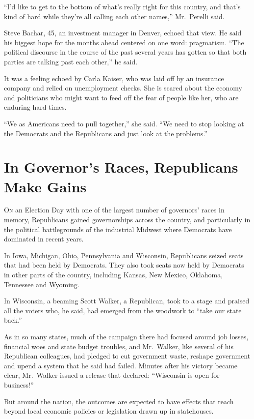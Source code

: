 ﻿\documentclass[12pt]{article}
\begin{document}
``I'd like to get to the bottom of what's really right for this country, and that's kind of hard
while they're all calling each other names,'' Mr.~Perelli said.

Steve Bachar, 45, an investment manager in Denver, echoed that view. He said his biggest hope for
the months ahead centered on one word: pragmatism. ``The political discourse in the course of the
past several years has gotten so that both parties are talking past each other,'' he said.

It was a feeling echoed by Carla Kaiser, who was laid off by an insurance company and relied on
unemployment checks. She is scared about the economy and politicians who might want to feed off the
fear of people like her, who are enduring hard times.

``We as Americans need to pull together,'' she said. ``We need to stop looking at the Democrats and
the Republicans and just look at the problems.''

\section{In Governor's Races, Republicans Make Gains}

\lettrine{O}{n} an Election Day with one of the largest number of governors'
races in memory, Republicans gained governorships across the country, and particularly in the
political battlegrounds of the industrial Midwest where Democrats have dominated in recent years.

In Iowa, Michigan, Ohio, Pennsylvania and Wisconsin, Republicans seized seats that had been held by
Democrats. They also took seats now held by Democrats in other parts of the country, including
Kansas, New Mexico, Oklahoma, Tennessee and Wyoming.

In Wisconsin, a beaming Scott Walker, a Republican, took to a stage and praised all the voters who,
he said, had emerged from the woodwork to ``take our state back.''

As in so many states, much of the campaign there had focused around job losses, financial woes and
state budget troubles, and Mr.~Walker, like several of his Republican colleagues, had pledged to cut
government waste, reshape government and upend a system that he said had failed. Minutes after his
victory became clear, Mr.~Walker issued a release that declared: ``Wisconsin is open for business!''

But around the nation, the outcomes are expected to have effects that reach beyond local economic
policies or legislation drawn up in statehouses.
\end{document}

